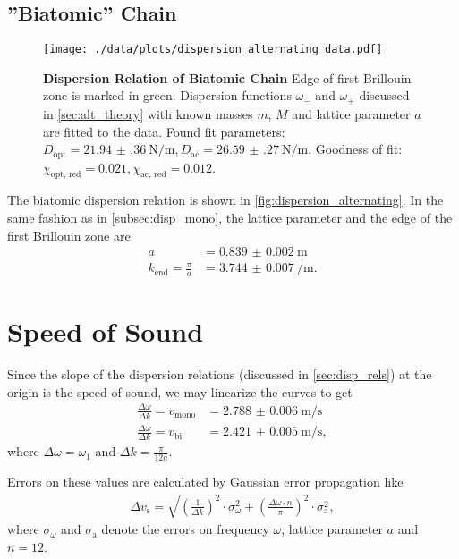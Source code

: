 \subsection{''Biatomic'' Chain}
\begin{figure}
	\centering
	\texttt{[image: ./data/plots/dispersion\_alternating\_data.pdf]}
	\caption[Dispersion Relation of Biatomic Chain]{\textbf{Dispersion Relation of Biatomic Chain} Edge of first Brillouin zone is marked in green.
	Dispersion functions $\omega_{-}$ and $\omega_{+}$ discussed in \autoref{sec:alt_theory} with known masses $m$, $M$ and lattice parameter $a$ are fitted to the data.
	Found fit parameters: $D_\text{opt}=\SI{21.94(36)}{\newton\per\meter}, D_\text{ac}=\SI{26.59(27)}{\newton\per\meter}$. Goodness of fit: $\chi_\text{opt, red}=\num{0.021}, \chi_\text{ac, red}=\num{0.012}$.}
	\label{fig:dispersion_alternating}
\end{figure}
The biatomic dispersion relation is shown in \autoref{fig:dispersion_alternating}.
In the same fashion as in \autoref{subsec:disp_mono}, the lattice parameter and the edge of the first Brillouin zone are
\begin{align*}
	a &= \SI{0.839(2)}{\meter} \\
	k_\text{end} = \frac{\pi}{a} &= \SI{3.744(7)}{\per\meter}.
\end{align*}

\section{Speed of Sound}\label{sec:speed_of_sound}
Since the slope of the dispersion relations (discussed in \autoref{sec:disp_rels}) at the origin is the speed of sound, we may linearize the curves to get
\begin{align*}
	\frac{\Delta\omega}{\Delta k} = v_\text{mono} &= \SI{2.788(6)}{\meter\per\second} \\
	\frac{\Delta\omega}{\Delta k} = v_\text{bi} &= \SI{2.421(5)}{\meter\per\second},
\end{align*}
where $\Delta\omega = \omega_1$ and $\Delta k = \frac{\pi}{12a}$.

Errors on these values are calculated by Gaussian error propagation like
\begin{align*}
	\Delta v_\text{s} = \sqrt{\left(\frac{1}{\Delta k}\right)^2 \cdot \sigma_\omega^2 + \left(\frac{\Delta\omega\cdot n}{\pi}\right)^2 \cdot \sigma_\text{a}^2},
\end{align*}
where $\sigma_\omega$ and $\sigma_\text{a}$ denote the errors on frequency $\omega$, lattice parameter $a$ and $n=12$.

